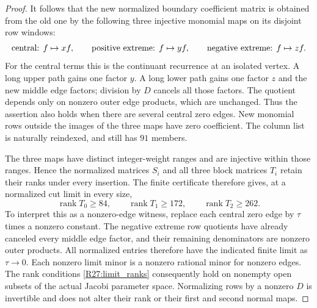 \begin{proof}
It follows that the new normalized boundary coefficient matrix
is obtained from the old one by the following three injective
monomial maps on its disjoint row windows:
\begin{equation}\label{R27:row_insertion}
 \hbox{central: }f\mapsto xf,\qquad
 \hbox{positive extreme: }f\mapsto yf,\qquad
 \hbox{negative extreme: }f\mapsto zf.
\end{equation}
For the central terms this is the continuant recurrence at an
isolated vertex. A long upper path gains one factor $y$.
A long lower path gains one factor $z$ and the new middle edge
factors; division by $D$ cancels all those factors. The quotient
depends only on nonzero outer edge products, which are unchanged.
Thus the assertion also holds when there are several central
zero edges. New monomial rows outside the images of the three
maps have zero coefficient. The column list is naturally
reindexed, and still has $91$ members.

The three maps have distinct integer-weight ranges and are
injective within those ranges. Hence the normalized matrices
$S_i$ and all three block matrices $T_i$ retain their ranks
under every insertion. The finite certificate therefore gives,
at a normalized cut limit in every size,
\begin{equation}\label{R27:limit_ranks}
 \operatorname{rank}T_0\geq84,\qquad
 \operatorname{rank}T_1\geq172,\qquad
 \operatorname{rank}T_2\geq262.
\end{equation}
To interpret this as a nonzero-edge witness, replace each
central zero edge by $\tau$ times a nonzero constant. The
negative extreme row quotients have already canceled every
middle edge factor, and their remaining denominators are
nonzero outer products. All normalized entries therefore have
the indicated finite limit as $\tau\to0$. Each nonzero limit
minor is a nonzero rational minor for nonzero edges. The rank
conditions \eqref{R27:limit_ranks} consequently hold on nonempty
open subsets of the actual Jacobi parameter space. Normalizing
rows by a nonzero $D$ is invertible and does not alter their
rank or their first and second normal maps.


\end{proof}

